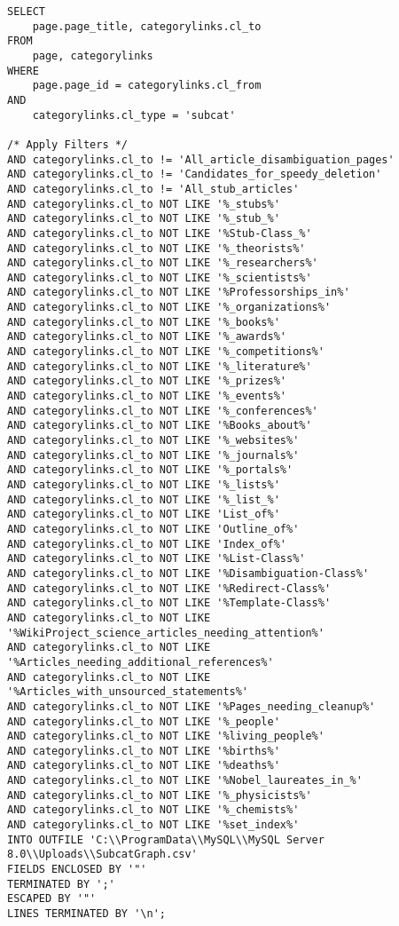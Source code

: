 \begin{sourcecode}
{\scriptsize \begin{verbatim}
SELECT
    page.page_title, categorylinks.cl_to
FROM
    page, categorylinks
WHERE
    page.page_id = categorylinks.cl_from
AND 
    categorylinks.cl_type = 'subcat'

/* Apply Filters */
AND categorylinks.cl_to != 'All_article_disambiguation_pages'
AND categorylinks.cl_to != 'Candidates_for_speedy_deletion'
AND categorylinks.cl_to != 'All_stub_articles'
AND categorylinks.cl_to NOT LIKE '%_stubs%'
AND categorylinks.cl_to NOT LIKE '%_stub_%'
AND categorylinks.cl_to NOT LIKE '%Stub-Class_%'
AND categorylinks.cl_to NOT LIKE '%_theorists%'
AND categorylinks.cl_to NOT LIKE '%_researchers%'
AND categorylinks.cl_to NOT LIKE '%_scientists%'
AND categorylinks.cl_to NOT LIKE '%Professorships_in%'
AND categorylinks.cl_to NOT LIKE '%_organizations%'
AND categorylinks.cl_to NOT LIKE '%_books%'
AND categorylinks.cl_to NOT LIKE '%_awards%'
AND categorylinks.cl_to NOT LIKE '%_competitions%'
AND categorylinks.cl_to NOT LIKE '%_literature%'
AND categorylinks.cl_to NOT LIKE '%_prizes%'
AND categorylinks.cl_to NOT LIKE '%_events%'
AND categorylinks.cl_to NOT LIKE '%_conferences%'
AND categorylinks.cl_to NOT LIKE '%Books_about%'
AND categorylinks.cl_to NOT LIKE '%_websites%'
AND categorylinks.cl_to NOT LIKE '%_journals%'
AND categorylinks.cl_to NOT LIKE '%_portals%'
AND categorylinks.cl_to NOT LIKE '%_lists%'
AND categorylinks.cl_to NOT LIKE '%_list_%'
AND categorylinks.cl_to NOT LIKE 'List_of%'
AND categorylinks.cl_to NOT LIKE 'Outline_of%'
AND categorylinks.cl_to NOT LIKE 'Index_of%'
AND categorylinks.cl_to NOT LIKE '%List-Class%'
AND categorylinks.cl_to NOT LIKE '%Disambiguation-Class%'
AND categorylinks.cl_to NOT LIKE '%Redirect-Class%'
AND categorylinks.cl_to NOT LIKE '%Template-Class%'
AND categorylinks.cl_to NOT LIKE '%WikiProject_science_articles_needing_attention%'
AND categorylinks.cl_to NOT LIKE '%Articles_needing_additional_references%'
AND categorylinks.cl_to NOT LIKE '%Articles_with_unsourced_statements%'
AND categorylinks.cl_to NOT LIKE '%Pages_needing_cleanup%'
AND categorylinks.cl_to NOT LIKE '%_people'
AND categorylinks.cl_to NOT LIKE '%living_people%'
AND categorylinks.cl_to NOT LIKE '%births%'
AND categorylinks.cl_to NOT LIKE '%deaths%'
AND categorylinks.cl_to NOT LIKE '%Nobel_laureates_in_%'
AND categorylinks.cl_to NOT LIKE '%_physicists%'
AND categorylinks.cl_to NOT LIKE '%_chemists%'
AND categorylinks.cl_to NOT LIKE '%set_index%'
INTO OUTFILE 'C:\\ProgramData\\MySQL\\MySQL Server 8.0\\Uploads\\SubcatGraph.csv'
FIELDS ENCLOSED BY '"'
TERMINATED BY ';'
ESCAPED BY '"'
LINES TERMINATED BY '\n';
\end{verbatim}}
\end{sourcecode}

